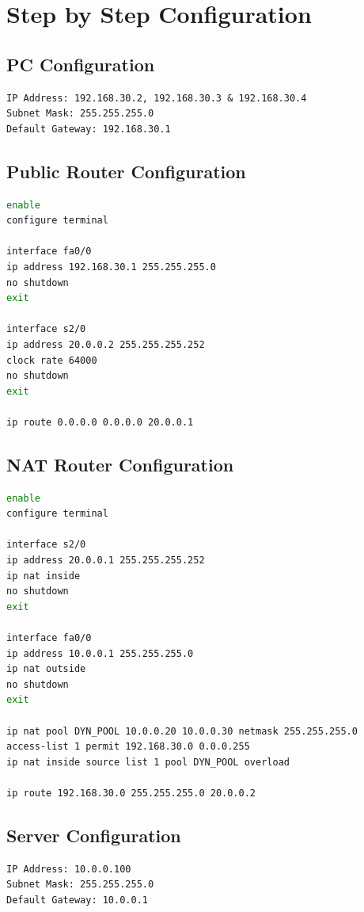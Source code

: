 \documentclass[a4paper,12pt]{article}
\begin{document}
\section*{Step by Step Configuration}

\subsection{PC Configuration}
\begin{lstlisting}
IP Address: 192.168.30.2, 192.168.30.3 & 192.168.30.4
Subnet Mask: 255.255.255.0
Default Gateway: 192.168.30.1
\end{lstlisting}

\subsection{Public Router Configuration}
\begin{lstlisting}[language=bash]
enable
configure terminal

interface fa0/0
ip address 192.168.30.1 255.255.255.0
no shutdown
exit

interface s2/0
ip address 20.0.0.2 255.255.255.252
clock rate 64000
no shutdown
exit

ip route 0.0.0.0 0.0.0.0 20.0.0.1
\end{lstlisting}

\subsection{NAT Router Configuration}
\begin{lstlisting}[language=bash]
enable
configure terminal

interface s2/0
ip address 20.0.0.1 255.255.255.252
ip nat inside
no shutdown
exit

interface fa0/0
ip address 10.0.0.1 255.255.255.0
ip nat outside
no shutdown
exit

ip nat pool DYN_POOL 10.0.0.20 10.0.0.30 netmask 255.255.255.0
access-list 1 permit 192.168.30.0 0.0.0.255
ip nat inside source list 1 pool DYN_POOL overload

ip route 192.168.30.0 255.255.255.0 20.0.0.2
\end{lstlisting}

\subsection{Server Configuration}
\begin{lstlisting}
IP Address: 10.0.0.100
Subnet Mask: 255.255.255.0
Default Gateway: 10.0.0.1
\end{lstlisting}
\end{document}
